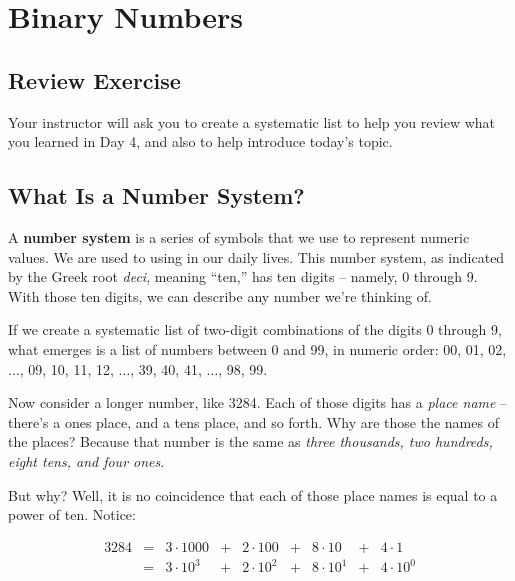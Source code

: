 
\chapter{Binary Numbers}


\minitoc

\section{Review Exercise}
\label{sec:syslistreview}

Your instructor will ask you to create a systematic list to help you review what you learned in Day 4, and also to help introduce today's topic.

\section{What Is a Number System?}

A \textbf{number system} is a series of symbols that we use to represent numeric values.  We are used to using  in our daily lives.  This number system, as indicated by the Greek root \textit{deci}, meaning ``ten,'' has ten digits -- namely, 0 through 9.  With those ten digits, we can describe any number we're thinking of.

If we create a systematic list of two-digit combinations of the digits 0 through 9, what emerges is a list of numbers between 0 and 99, in numeric order:  00, 01, 02, $\ldots$, 09, 10, 11, 12, $\ldots$, 39, 40, 41, $\ldots$, 98, 99.

Now consider a longer number, like 3284.  Each of those digits has a \textit{place name} -- there's a ones place, and a tens place, and so forth.  Why are those the names of the places?  Because that number is the same as \textit{three thousands, two hundreds, eight tens, and four ones}.

But why?  Well, it is no coincidence that each of those place names is equal to a power of ten.  Notice:

\[
\begin{array}{rclclclcl}
    3284 & = & 3 \cdot 1000 & + & 2 \cdot 100 & + & 8 \cdot 10 & + & 4 \cdot 1\\
         & = & 3 \cdot 10^3 & + & 2 \cdot 10^2 & + & 8 \cdot 10^1 & + & 4 \cdot 10^0\\
\end{array}
\]

